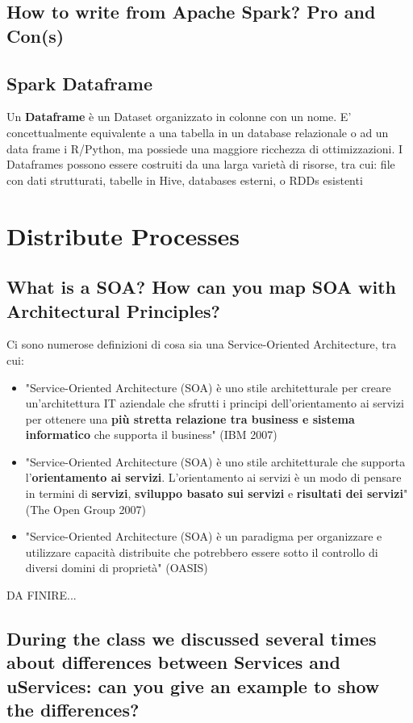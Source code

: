 \documentclass{article}
\begin{document}
\subsection{How to write from Apache Spark? Pro and Con(s)}
\subsection{Spark Dataframe}
Un \textbf{Dataframe} è un Dataset organizzato in colonne con un nome. E' concettualmente equivalente a una tabella in un database relazionale o ad un data frame i R/Python, ma possiede una maggiore ricchezza di ottimizzazioni. 
\newline I Dataframes possono essere costruiti da una larga varietà di risorse, tra cui: file con dati strutturati, tabelle in Hive, databases esterni, o RDDs esistenti

\section{Distribute Processes}
\subsection{What is a SOA? How can you map SOA with Architectural Principles?}
Ci sono numerose definizioni di cosa sia una Service-Oriented Architecture, tra cui:
\begin{itemize}
    \item "Service-Oriented Architecture (SOA) è uno stile architetturale per creare un'architettura IT aziendale che sfrutti i principi dell'orientamento ai servizi per ottenere una \textbf{più stretta relazione tra business e sistema informatico} che supporta il business" (IBM 2007)
    \item "Service-Oriented Architecture (SOA) è uno stile architetturale che supporta l'\textbf{orientamento ai servizi}. L'orientamento ai servizi è un modo di pensare in termini di \textbf{servizi}, \textbf{sviluppo basato sui servizi} e \textbf{risultati dei servizi}" (The Open Group 2007)
    \item "Service-Oriented Architecture (SOA) è un paradigma per organizzare e utilizzare capacità distribuite che potrebbero essere sotto il controllo di diversi domini di proprietà" (OASIS)
\end{itemize}
DA FINIRE...

\subsection{During the class we discussed several times about differences between Services and uServices: can you give an example to show the differences?}
\end{document}

